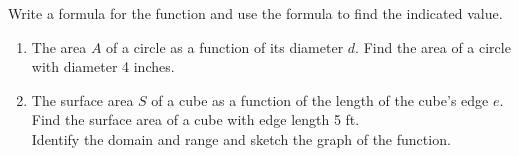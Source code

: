 \documentclass[11pt]{article}
\begin{document}
    \noindent Write a formula for the function and use the formula to find the indicated value.

    \begin{enumerate}

        \item The area $A$ of a circle as a function of its diameter $d$. Find the area of a circle with diameter 4 inches.\\[4ex]

        \item The surface area $S$ of a cube as a function of the length of the cube's edge $e$. Find the surface area of a cube with edge length 5 ft.\\[4ex]

        \noindent Identify the domain and range and sketch the graph of the function.






\end{enumerate}
\end{document}
